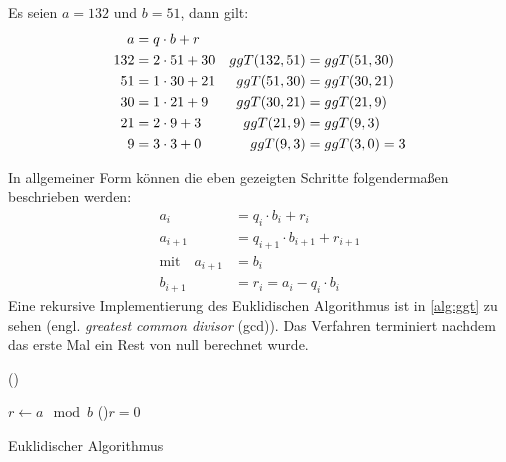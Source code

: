 \begin{example}
  Es seien $a=132$ und $b=51$, dann gilt:
  \begin{align*}
    a   & = q \cdot b + r   &               &                  \\
    132 & = 2 \cdot 51 + 30 & ggT(132,51) & = ggT(51,30)   \\
    51  & = 1 \cdot 30 + 21 & ggT(51,30)  & = ggT(30,21)   \\
    30  & = 1 \cdot 21 + 9  & ggT(30,21)  & = ggT(21,9)    \\
    21  & = 2 \cdot 9 + 3   & ggT(21,9)   & = ggT(9,3)     \\
    9   & = 3 \cdot 3 + 0   & ggT(9,3)    & = ggT(3,0) = 3
  \end{align*}
\end{example}
\noindent
In allgemeiner Form können die eben gezeigten Schritte folgendermaßen beschrieben werden:
\begin{equation}
  \label{eq:euklid}
  \begin{split}
    a_i     & = q_i \cdot b_i + r_i \\
    a_{i+1} & = q_{i+1} \cdot b_{i+1} + r_{i+1} \\
    \text{mit} \quad a_{i+1} & = b_i \\
    b_{i+1} & = r_i = a_i - q_i \cdot b_i
  \end{split}
\end{equation}
Eine rekursive Implementierung des Euklidischen Algorithmus ist in \autoref{alg:ggt}
zu sehen (engl. \textit{greatest common divisor} (gcd)).
Das Verfahren terminiert nachdem das erste Mal ein Rest von null berechnet wurde.
\begin{algorithm}
  \DontPrintSemicolon
  \Begin(){
    $r \leftarrow a \mod{b}$\;
    \If(){$r = 0$}{
    }

  }
  \caption{Euklidischer Algorithmus}
  \label{alg:ggt}
\end{algorithm}
